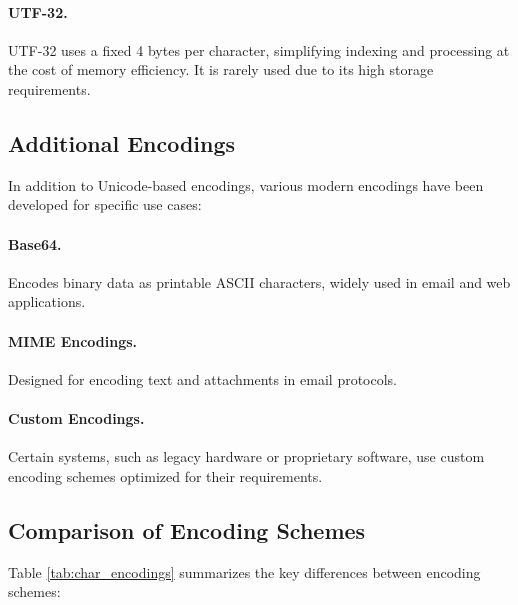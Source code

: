 \paragraph{UTF-32.}
UTF-32 uses a fixed 4 bytes per character, simplifying indexing and processing at the cost of memory efficiency. It is rarely used due to its high storage requirements.

\subsection{Additional Encodings}

In addition to Unicode-based encodings, various modern encodings have been developed for specific use cases:

    \paragraph{Base64.} Encodes binary data as printable ASCII characters, widely used in email and web applications.
    \paragraph{MIME Encodings.} Designed for encoding text and attachments in email protocols.
    \paragraph{Custom Encodings.} Certain systems, such as legacy hardware or proprietary software, use custom encoding schemes optimized for their requirements.


\subsection{Comparison of Encoding Schemes}

Table \ref{tab:char_encodings} summarizes the key differences between encoding schemes:

